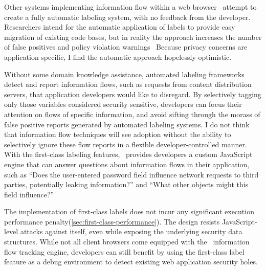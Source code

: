 
Other systems implementing information flow within a web browser~\cite{jang.etal+10,meyerovich.livshits+10,just.etal+11} attempt to create a fully automatic labeling system, with no feedback from the developer.
Researchers intend for the automatic application of labels to provide easy migration of existing code bases, but in reality the approach increases the number of false positives and policy violation warnings~\cite{sabelfeld.myers+03, slowinska.bos+09}
Because privacy concerns are application specific, I find the automatic approach hopelessly optimistic.

Without some domain knowledge assistance, automated labeling frameworks detect and report information flows, such as requests from content distribution servers, that application developers would like to disregard.
By selectively tagging only those variables considered security sensitive, developers can focus their attention on flows of specific information, and avoid sifting through the morass of false positive reports generated by automated labeling systems.
I do not think that information flow techniques will see adoption without the ability to selectively ignore these flow reports in a flexible developer-controlled manner.
With the first-class labeling features, \FlowCore\ provides developers a custom JavaScript engine that can answer questions about information flows in their application, such as ``Does the user-entered password field influence network requests to third parties, potentially leaking information?'' and ``What other objects might this field influence?''

The implementation of first-class labels does not incur any significant execution performance penalty(\autoref{sec:first-class-performance}).
The design resists JavaScript-level attacks against itself, even while exposing the underlying security data structures.
While not all client browsers come equipped with the \FlowCore\ information flow tracking engine, developers can still benefit by using the first-class label feature as a debug environment to detect existing web application security holes.

